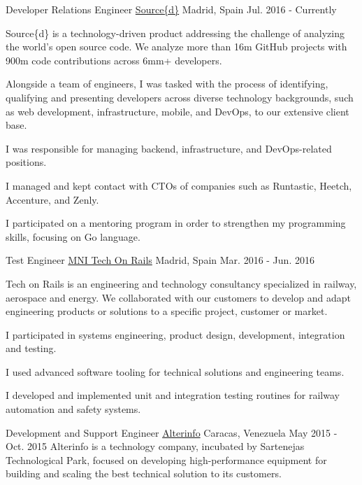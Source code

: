 \begin{cventries}
  \cventry
    {Developer Relations Engineer}
    {\href{http://www.sourced.tech/}{Source\{d\}}}
    {Madrid, Spain}
    {Jul. 2016 - Currently}
    {
      Source\{d\} is a technology-driven product addressing the challenge of analyzing the world's open source code. We analyze more than 16m GitHub projects with 900m code contributions across 6mm+ developers.\vspace{4mm}
      \begin{cvitems}
      \item {Alongside a team of engineers, I was tasked with the process of identifying, qualifying and presenting developers across diverse technology backgrounds, such as web development, infrastructure, mobile, and DevOps, to our extensive client base.} 
      \item {I was responsible for managing backend, infrastructure, and DevOps-related positions.}
      \item {I managed and kept contact with CTOs of companies such as Runtastic, Heetch, Accenture, and Zenly.}
      \item {I participated on a mentoring program in order to strengthen my programming skills, focusing on Go language.}
      \end{cvitems}
    }
  \cventry
    {Test Engineer}
    {\href{http://www.techonrails.com/}{MNI Tech On Rails}}
    {Madrid, Spain}
    {Mar. 2016 - Jun. 2016}
    {
      Tech on Rails is an engineering and technology consultancy specialized in railway, aerospace and energy. We collaborated with our customers to develop and adapt engineering products or solutions to a specific project, customer or market.\vspace{4mm}
      \begin{cvitems}
        \item {I participated in systems engineering, product design, development, integration and testing.}
        \item {I used advanced software tooling for technical solutions and engineering teams.}
        \item {I developed and implemented unit and integration testing routines for railway automation and safety systems.}
      \end{cvitems}
    }
  \cventry
    {Development and Support Engineer}
    {\href{http://www.alter-info.com/}{Alterinfo}}
    {Caracas, Venezuela}
    {May 2015 - Oct. 2015}
    {
    Alterinfo is a technology company, incubated by Sartenejas Technological Park, focused on developing high-performance equipment for building and scaling the best technical solution to its customers.\vspace{4mm}
}
\end{cventries}

